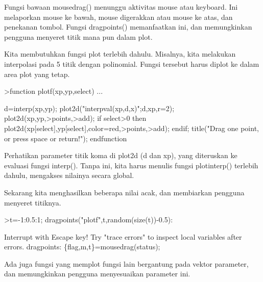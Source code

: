 \documentclass[a4paper,10pt]{article}
\begin{document}
\begin{eulernotebook}
\begin{eulercomment}
\begin{eulercomment}
\begin{eulercomment}
\begin{eulercomment}
\begin{eulercomment}
Fungsi bawaan mousedrag() menunggu aktivitas mouse atau keyboard. Ini
melaporkan mouse ke bawah, mouse digerakkan atau mouse ke atas, dan
penekanan tombol. Fungsi dragpoints() memanfaatkan ini, dan
memungkinkan pengguna menyeret titik mana pun dalam plot.

Kita membutuhkan fungsi plot terlebih dahulu. Misalnya, kita melakukan
interpolasi pada 5 titik dengan polinomial. Fungsi tersebut harus
diplot ke dalam area plot yang tetap.
\end{eulercomment}
\begin{eulerprompt}
>function plotf(xp,yp,select) ...
\end{eulerprompt}
\begin{eulerudf}
    d=interp(xp,yp);
    plot2d("interpval(xp,d,x)";d,xp,r=2);
    plot2d(xp,yp,>points,>add);
    if select>0 then
      plot2d(xp[select],yp[select],color=red,>points,>add);
    endif;
    title("Drag one point, or press space or return!");
  endfunction
\end{eulerudf}
\begin{eulercomment}
Perhatikan parameter titik koma di plot2d (d dan xp), yang diteruskan
ke evaluasi fungsi interp(). Tanpa ini, kita harus menulis fungsi
plotinterp() terlebih dahulu, mengakses nilainya secara global.

Sekarang kita menghasilkan beberapa nilai acak, dan membiarkan
pengguna menyeret titiknya.
\end{eulercomment}
\begin{eulerprompt}
>t=-1:0.5:1; dragpoints("plotf",t,random(size(t))-0.5):
\end{eulerprompt}
\begin{euleroutput}
  Interrupt with Escape key!
  Try "trace errors" to inspect local variables after errors.
  dragpoints:
      \{flag,m,t\}=mousedrag(status);
\end{euleroutput}
\begin{eulercomment}
Ada juga fungsi yang memplot fungsi lain bergantung pada vektor
parameter, dan memungkinkan pengguna menyesuaikan parameter ini.


\end{eulercomment}
\end{eulercomment}
\end{eulercomment}
\end{eulercomment}
\end{eulercomment}
\end{eulernotebook}
\end{document}
